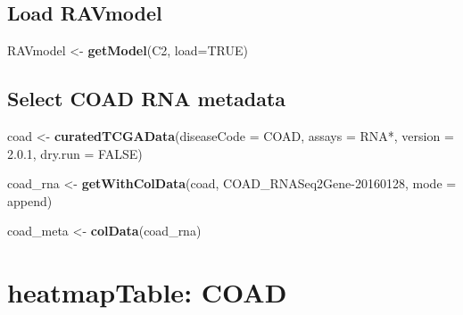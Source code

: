 \documentclass[
]{article}
\newenvironment{Shaded}{\begin{snugshade}}{\end{snugshade}}
\newcommand{\AttributeTok}[1]{\textcolor[rgb]{0.13,0.29,0.53}{#1}}
\newcommand{\ConstantTok}[1]{\textcolor[rgb]{0.56,0.35,0.01}{#1}}
\newcommand{\FunctionTok}[1]{\textcolor[rgb]{0.13,0.29,0.53}{\textbf{#1}}}
\newcommand{\NormalTok}[1]{#1}
\newcommand{\OtherTok}[1]{\textcolor[rgb]{0.56,0.35,0.01}{#1}}
\newcommand{\StringTok}[1]{\textcolor[rgb]{0.31,0.60,0.02}{#1}}
\begin{document}
\hypertarget{load-ravmodel}{%
\subsection{Load RAVmodel}\label{load-ravmodel}}

\begin{Shaded}
\begin{Highlighting}[]
\NormalTok{RAVmodel }\OtherTok{\textless{}{-}} \FunctionTok{getModel}\NormalTok{(}\StringTok{\textquotesingle{}C2\textquotesingle{}}\NormalTok{, }\AttributeTok{load=}\ConstantTok{TRUE}\NormalTok{)}
\end{Highlighting}
\end{Shaded}

\hypertarget{select-coad-rna-metadata}{%
\subsection{Select COAD RNA metadata}\label{select-coad-rna-metadata}}

\begin{Shaded}
\begin{Highlighting}[]
\NormalTok{coad }\OtherTok{\textless{}{-}} \FunctionTok{curatedTCGAData}\NormalTok{(}\AttributeTok{diseaseCode =} \StringTok{\textquotesingle{}COAD\textquotesingle{}}\NormalTok{,}
                        \AttributeTok{assays =} \StringTok{\textquotesingle{}RNA*\textquotesingle{}}\NormalTok{,}
                        \AttributeTok{version =} \StringTok{\textquotesingle{}2.0.1\textquotesingle{}}\NormalTok{,}
                        \AttributeTok{dry.run =} \ConstantTok{FALSE}\NormalTok{)}

\NormalTok{coad\_rna }\OtherTok{\textless{}{-}} \FunctionTok{getWithColData}\NormalTok{(coad,}
                           \StringTok{\textquotesingle{}COAD\_RNASeq2Gene{-}20160128\textquotesingle{}}\NormalTok{,}
                           \AttributeTok{mode =} \StringTok{\textquotesingle{}append\textquotesingle{}}\NormalTok{)}

\NormalTok{coad\_meta }\OtherTok{\textless{}{-}} \FunctionTok{colData}\NormalTok{(coad\_rna)}
\end{Highlighting}
\end{Shaded}

\hypertarget{heatmaptable-coad}{%
\section{heatmapTable: COAD}\label{heatmaptable-coad}}
\end{document}

